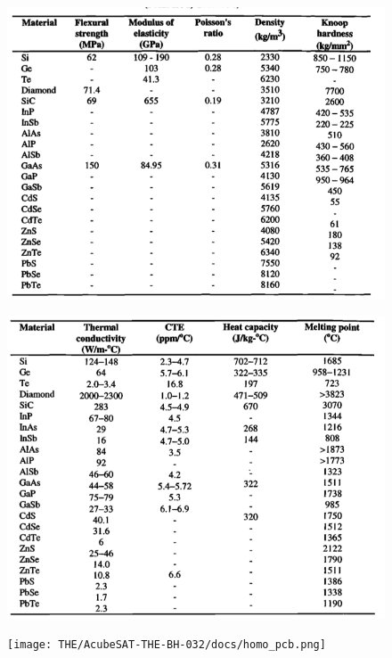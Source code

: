 \documentclass[final]{cubedoc}
\begin{document}
	\begin{figure}[h!]
		\centering
		\includegraphics[keepaspectratio, width=\textwidth]{docs/density_table.png}
		\caption{\cite[p.24]{pecht1998electronic}}
		\label{fig:my_label}
	\end{figure}
	
	\begin{figure}[h!]
		\centering
		\includegraphics[keepaspectratio, width=\textwidth]{docs/material_overall_properties.png}
		\caption{\cite[p.25]{pecht1998electronic}}
		\label{fig:my_label}
	\end{figure}
	
	\begin{figure}[h!]
		\centering
		\texttt{[image: THE/AcubeSAT-THE-BH-032/docs/homo\_pcb.png]}
		\caption{\cite[p.20]{airborne}}
		\label{fig:my_label}
	\end{figure}
	
\end{document}
